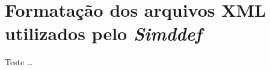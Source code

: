 \chapter{Formatação dos arquivos XML utilizados pelo \emph{Simddef}}
\label{ap:formatacao_xml}
Teste \ldots
